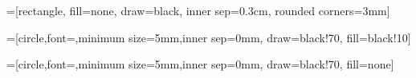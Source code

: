 \RequirePackage{pifont,manfnt}
\RequirePackage{booktabs}
\RequirePackage[T1]{fontenc}
\RequirePackage{mathpazo}
\RequirePackage{eulervm}
\RequirePackage{tikz}
\linespread{1.05}
\RequirePackage{xspace}
\RequirePackage{apacite}
\RequirePackage{rotating}
\RequirePackage{multirow}
\usepackage{fontawesome}
\usepackage{nth}

\newcommand{\Prob}[1]{\mathrm{P}( #1 )}
\newcommand{\dcat}[1]{\mathrm{dcat}( #1 )}
\newcommand{\ddirichlet}[1]{\mathrm{ddirichlet}( #1 )}
\newcommand*{\given}{\vert}
\newcommand{\hdpmm}{\textsc{hdptm}\xspace}
\newcommand{\bnc}{\textsc{bnc}\xspace}

\newcommand\iidsim{\mathrel{\overset{\makebox[0pt]{\mbox{\normalfont\tiny iid}}}{\sim}}}
\newcommand\defeq{\mathrel{\overset{\makebox[0pt]{\mbox{\normalfont\tiny def}}}{=}}}
\newcommand{\hpd}{\textsc{hpd}\xspace}
\newcommand{\Probc}[1]{\mathrm{P}_{\text{\!\tiny \textsc{c}}}( #1 )}
\newcommand{\Proba}[1]{\mathrm{P}_{\text{\!\tiny \textsc{a}}}( #1 )}
\newcommand{\wnew}{w_{j}}
\newcommand{\wjinew}{w_{ji}}
\newcommand{\pinew}{\pi_{j}}
\newcommand{\data}{\mathcal{D}}
\newcommand{\dic}{\textsc{dic}\xspace}


\RequirePackage{tikz}
\usetikzlibrary{trees}
\usetikzlibrary{matrix}

\RequirePackage{amssymb,latexsym,amsmath,amsfonts,amscd}


\newcommand{\rreallytiny}{\fontsize{3}{3}\selectfont}
\newcommand{\reallytiny}{\fontsize{5}{5}\selectfont}

\usetikzlibrary{decorations.pathmorphing} %
\usetikzlibrary{fit}					%
\usetikzlibrary{backgrounds}	%
\usetikzlibrary{matrix}

=[rectangle, fill=none,
						draw=black,
                                                inner sep=0.3cm,
                                                rounded corners=3mm]

=[circle,font=\small,minimum size=5mm,inner sep=0mm,
                                    draw=black!70,
                                    fill=black!10]

=[circle,font=\small,minimum size=5mm,inner sep=0mm,
                                   draw=black!70,
                                    fill=none]


